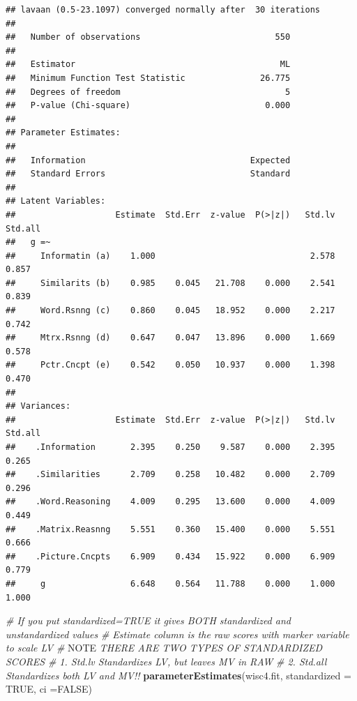 \documentclass[]{book}
\newenvironment{Shaded}{\begin{snugshade}}{\end{snugshade}}
\newcommand{\KeywordTok}[1]{\textcolor[rgb]{0.13,0.29,0.53}{\textbf{#1}}}
\newcommand{\DataTypeTok}[1]{\textcolor[rgb]{0.13,0.29,0.53}{#1}}
\newcommand{\CommentTok}[1]{\textcolor[rgb]{0.56,0.35,0.01}{\textit{#1}}}
\newcommand{\OtherTok}[1]{\textcolor[rgb]{0.56,0.35,0.01}{#1}}
\newcommand{\AlertTok}[1]{\textcolor[rgb]{0.94,0.16,0.16}{#1}}
\newcommand{\NormalTok}[1]{#1}
\theoremstyle{definition}
\theoremstyle{definition}
\theoremstyle{definition}
\theoremstyle{remark}
\begin{document}
\begin{verbatim}
## lavaan (0.5-23.1097) converged normally after  30 iterations
## 
##   Number of observations                           550
## 
##   Estimator                                         ML
##   Minimum Function Test Statistic               26.775
##   Degrees of freedom                                 5
##   P-value (Chi-square)                           0.000
## 
## Parameter Estimates:
## 
##   Information                                 Expected
##   Standard Errors                             Standard
## 
## Latent Variables:
##                    Estimate  Std.Err  z-value  P(>|z|)   Std.lv  Std.all
##   g =~                                                                  
##     Informatin (a)    1.000                               2.578    0.857
##     Similarits (b)    0.985    0.045   21.708    0.000    2.541    0.839
##     Word.Rsnng (c)    0.860    0.045   18.952    0.000    2.217    0.742
##     Mtrx.Rsnng (d)    0.647    0.047   13.896    0.000    1.669    0.578
##     Pctr.Cncpt (e)    0.542    0.050   10.937    0.000    1.398    0.470
## 
## Variances:
##                    Estimate  Std.Err  z-value  P(>|z|)   Std.lv  Std.all
##    .Information       2.395    0.250    9.587    0.000    2.395    0.265
##    .Similarities      2.709    0.258   10.482    0.000    2.709    0.296
##    .Word.Reasoning    4.009    0.295   13.600    0.000    4.009    0.449
##    .Matrix.Reasnng    5.551    0.360   15.400    0.000    5.551    0.666
##    .Picture.Cncpts    6.909    0.434   15.922    0.000    6.909    0.779
##     g                 6.648    0.564   11.788    0.000    1.000    1.000
\end{verbatim}

\begin{Shaded}
\begin{Highlighting}[]
\CommentTok{# If you put standardized=TRUE it gives BOTH standardized and unstandardized values}
\CommentTok{# Estimate column is the raw scores with marker variable to scale LV }
\CommentTok{# }\AlertTok{NOTE}\CommentTok{ THERE ARE TWO TYPES OF STANDARDIZED SCORES}
\CommentTok{# 1. Std.lv Standardizes LV, but leaves MV in RAW}
\CommentTok{# 2. Std.all Standardizes both LV and MV!!}
\KeywordTok{parameterEstimates}\NormalTok{(wisc4.fit, }\DataTypeTok{standardized =} \OtherTok{TRUE}\NormalTok{, }\DataTypeTok{ci =}\OtherTok{FALSE}\NormalTok{)}
\end{Highlighting}
\end{Shaded}
\end{document}
